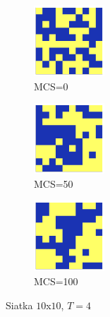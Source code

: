 \documentclass[12pt]{article}
\begin{document}
\begin{figure}[H]
  \centering

  \begin{subfigure}[b]{0.3\linewidth}
    \centering
    \includegraphics[width=100px, height=100px]{../data/snaps/snap10_temp4.0_moment1.png}
    \caption{MCS=0}
    \label{fig:image1}
  \end{subfigure}
  \hfill
  \begin{subfigure}[b]{0.3\linewidth}
    \centering
    \includegraphics[width=100px, height=100px]{../data/snaps/snap10_temp4.0_moment50.png}
    \caption{MCS=50}
    \label{fig:image2}
  \end{subfigure}
  \hfill
  \begin{subfigure}[b]{0.3\linewidth}
    \centering
    \includegraphics[width=100px, height=100px]{../data/snaps/snap10_temp4.0_moment100.png}
    \caption{MCS=100}
    \label{fig:image3}
  \end{subfigure}

  \caption{Siatka $10$x$10$, $T=4$}
  \label{fig:series}
\end{figure}
\end{document}
